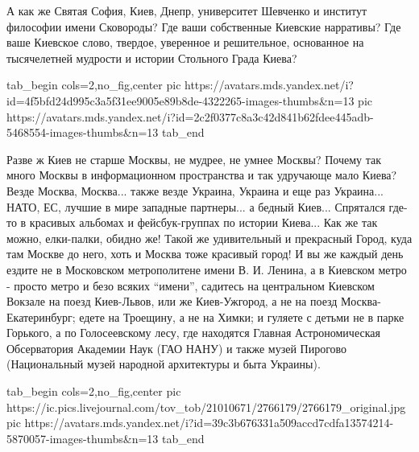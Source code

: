 А как же Святая София, Киев, Днепр, университет Шевченко и институт
философии имени Сковороды? Где ваши собственные Киевские нарративы? Где ваше
Киевское слово, твердое, уверенное и решительное, основанное на тысячелетней
мудрости и истории Стольного Града Киева? 

\ifcmt
  tab_begin cols=2,no_fig,center
     pic https://avatars.mds.yandex.net/i?id=4f5bfd24d995c3a5f31ee9005e89b8de-4322265-images-thumbs&n=13
		 pic https://avatars.mds.yandex.net/i?id=2c2f0377c8a3c42d841b62fdee445adb-5468554-images-thumbs&n=13
  tab_end
\fi

Разве ж Киев не старше Москвы, не мудрее, не умнее Москвы?  Почему так много
Москвы в информационном пространства и так удручающе мало Киева? Везде Москва,
Москва... также везде Украина, Украина и еще раз Украина... НАТО, ЕС, лучшие в
мире западные партнеры...  а бедный Киев... Спрятался где-то в красивых
альбомах и фейсбук-группах по истории Киева... Как же так можно, елки-палки,
обидно же! Такой же удивительный и прекрасный Город, куда там Москве до него,
хоть и Москва тоже красивый город! И вы же каждый день ездите не в Московском
метрополитене имени В. И. Ленина, а в Киевском метро - просто метро и безо
всяких \enquote{имени}, садитесь на центральном Киевском Вокзале на поезд
Киев-Львов, или же  Киев-Ужгород, а не на поезд Москва-Екатеринбург; едете на
Троещину, а не на Химки; и гуляете с детьми не в парке Горького, а по
Голосеевскому лесу, где находятся Главная Астрономическая Обсерватория Академии
Наук (ГАО НАНУ) и также музей Пирогово (Национальный музей народной архитектуры
и быта Украины).

\ifcmt
  tab_begin cols=2,no_fig,center
		 pic https://ic.pics.livejournal.com/tov_tob/21010671/2766179/2766179_original.jpg
		 pic https://avatars.mds.yandex.net/i?id=39c3b676331a509accd7cdfa13574214-5870057-images-thumbs&n=13
  tab_end
\fi

